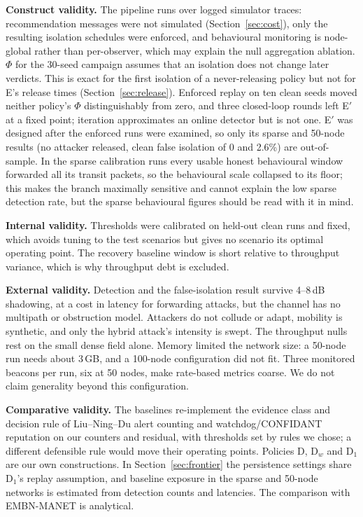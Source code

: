 \textbf{Construct validity.} The pipeline runs over logged simulator traces:
recommendation messages were not simulated (Section~\ref{sec:cost}), only the
resulting isolation schedules were enforced, and behavioural monitoring is
node-global rather than per-observer, which may explain the null aggregation
ablation. $\Phi$ for the 30-seed campaign assumes that an isolation does not
change later verdicts. This is exact for the first isolation of a
never-releasing policy but not for E's release times
(Section~\ref{sec:release}). Enforced replay on ten clean seeds moved neither
policy's $\Phi$ distinguishably from zero, and three closed-loop rounds left
E$'$ at a fixed point; iteration approximates an online detector but is not
one. E$'$ was designed after the enforced runs were examined, so only its
sparse and 50-node results (no attacker released, clean false isolation of 0
and 2.6\%) are out-of-sample. In the sparse calibration runs every usable
honest behavioural window forwarded all its transit packets, so the
behavioural scale collapsed to its floor; this makes the branch maximally
sensitive and cannot explain the low sparse detection rate, but the sparse
behavioural figures should be read with it in mind.

\textbf{Internal validity.} Thresholds were calibrated on held-out clean runs
and fixed, which avoids tuning to the test scenarios but gives no scenario its
optimal operating point. The recovery baseline window is short relative to
throughput variance, which is why throughput debt is excluded.

\textbf{External validity.} Detection and the false-isolation result survive
4--8\,dB shadowing, at a cost in latency for forwarding attacks, but the
channel has no multipath or obstruction model. Attackers do not collude or
adapt, mobility is synthetic, and only the hybrid attack's intensity is swept.
The throughput nulls rest on the small dense field alone. Memory limited the
network size: a 50-node run needs about 3\,GB, and a 100-node configuration
did not fit. Three monitored beacons per run, six at 50 nodes, make
rate-based metrics coarse. We do not claim generality beyond this
configuration.

\textbf{Comparative validity.} The baselines re-implement the evidence class
and decision rule of Liu--Ning--Du alert counting and watchdog/CONFIDANT
reputation on our counters and residual, with thresholds set by rules we
chose; a different defensible rule would move their operating points. Policies
D, D$_w$ and D$_1$ are our own constructions. In Section~\ref{sec:frontier}
the persistence settings share D$_1$'s replay assumption, and baseline
exposure in the sparse and 50-node networks is estimated from detection counts
and latencies. The comparison with EMBN-MANET is analytical.

